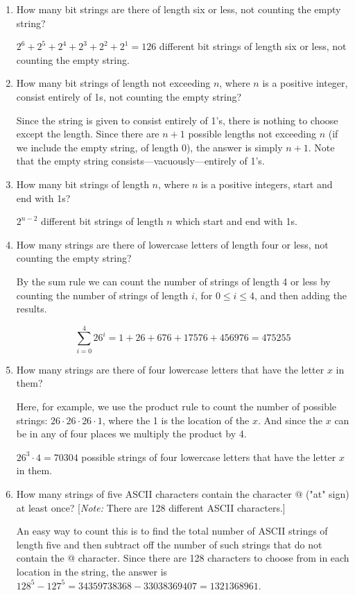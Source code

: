 \documentclass[11pt]{article}
\begin{document}
\begin{enumerate}[label=\textbf{\arabic*.}]
	\item How many bit strings are there of length six or less, not counting the empty string?
	
	$2^6 + 2^5 + 2^4 + 2^3 + 2^2 + 2^1 = 126$ different bit strings of length six or less, not counting the empty string.
	
	\item How many bit strings of length not exceeding $n$, where $n$ is a positive integer, consist entirely of 1s, not counting the empty string?
	
	Since the string is given to consist entirely of 1's, there is nothing to choose except the length. Since there are $n + 1$ possible lengths not exceeding $n$ (if we include the empty string, of length 0), the answer is simply $n + 1$. Note that the empty string consists---vacuously---entirely of 1's.
	
	\item How many bit strings of length $n$, where $n$ is a positive integers, start and end with 1s?
	
	$2^{n - 2}$ different bit strings of length $n$ which start and end with 1s.
	
	\item How many strings are there of lowercase letters of length four or less, not counting the empty string?
	
	By the sum rule we can count the number of strings of length 4 or less by counting the number of strings of length $i$, for $0 \leq i \leq 4$, and then adding the results.
	
	$$\sum_{i=0}^{4} 26^i = 1 + 26 + 676 + 17576 + 456976 = 475255$$
	
	\item How many strings are there of four lowercase letters that have the letter $x$ in them?
	
	Here, for example, we use the product rule to count the number of possible strings: $26 \cdot 26 \cdot 26 \cdot 1$, where the 1 is the location of the $x$. And since the $x$ can be in any of four places we multiply the product by 4.
	
	$26^3 \cdot 4 = 70304$ possible strings of four lowercase letters that have the letter $x$ in them.
	
	\item How many strings of five ASCII characters contain the character @ ("at" sign) at least once? [\emph{Note:} There are 128 different ASCII characters.]
	
	An easy way to count this is to find the total number of ASCII strings of length five and then subtract off the number of such strings that do not contain the @ character. Since there are 128 characters to choose from in each location in the string, the answer is $128^5 - 127^5 = 34359738368 - 33038369407 = 1321368961$.
	

\end{enumerate}
\end{document}
